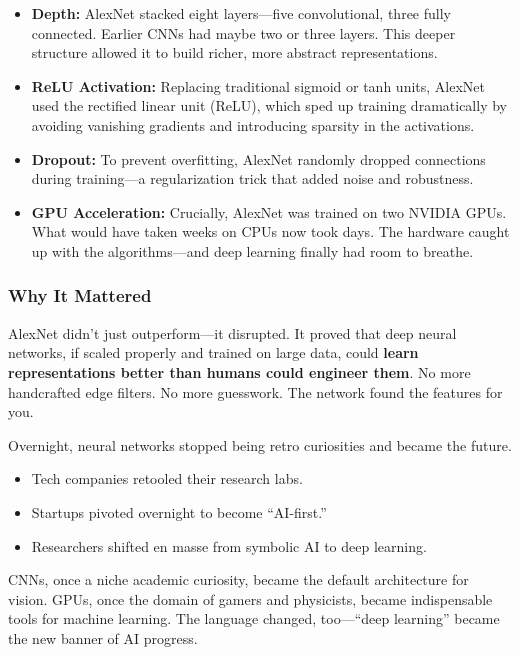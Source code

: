 \begin{itemize}
  \item \textbf{Depth:} AlexNet stacked eight layers—five convolutional, three fully connected. Earlier CNNs had maybe two or three layers. This deeper structure allowed it to build richer, more abstract representations.
  
  \item \textbf{ReLU Activation:} Replacing traditional sigmoid or tanh units, AlexNet used the rectified linear unit (ReLU), which sped up training dramatically by avoiding vanishing gradients and introducing sparsity in the activations.
  
  \item \textbf{Dropout:} To prevent overfitting, AlexNet randomly dropped connections during training—a regularization trick that added noise and robustness.
  
  \item \textbf{GPU Acceleration:} Crucially, AlexNet was trained on two NVIDIA GPUs. What would have taken weeks on CPUs now took days. The hardware caught up with the algorithms—and deep learning finally had room to breathe.
\end{itemize}

\subsubsection{Why It Mattered}

AlexNet didn’t just outperform—it disrupted.  
It proved that deep neural networks, if scaled properly and trained on large data, could \textbf{learn representations better than humans could engineer them}. No more handcrafted edge filters. No more guesswork. The network found the features for you.

Overnight, neural networks stopped being retro curiosities and became the future.

\begin{itemize}
  \item Tech companies retooled their research labs.
  \item Startups pivoted overnight to become “AI-first.”
  \item Researchers shifted en masse from symbolic AI to deep learning.
\end{itemize}

CNNs, once a niche academic curiosity, became the default architecture for vision.  
GPUs, once the domain of gamers and physicists, became indispensable tools for machine learning.  
The language changed, too—“deep learning” became the new banner of AI progress.

